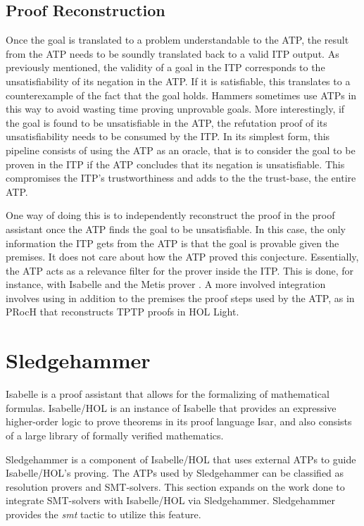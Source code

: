 \documentclass{article}
\begin{document}
		\subsection{Proof Reconstruction}
		Once the goal is translated to a problem understandable 
		to the ATP, the result from the ATP needs to be 
		soundly translated back to a valid ITP output.
		As previously mentioned, the validity of a goal in 
		the ITP corresponds to the unsatisfiability of its 
		negation in the ATP. If it is satisfiable, this 
		translates to a counterexample of the fact that 
		the goal holds. Hammers sometimes use ATPs 
		in this way to avoid wasting time proving 
		unprovable goals. More interestingly, if the 
		goal is found to be unsatisfiable in the ATP, 
		the refutation proof of its unsatisfiability
		needs to be consumed by the ITP. In its simplest form,
		this pipeline consists of using the ATP as an oracle, 
		that is to consider the goal to be proven in the 
		ITP if the ATP concludes that its negation is 
		unsatisfiable. This compromises the ITP's 
		trustworthiness and adds to the the trust-base, 
		the entire ATP.
		
		One way of doing this is to independently reconstruct 
		the proof in the proof assistant once the ATP finds 
		the goal to be unsatisfiable. In this case, the 
		only information the ITP gets from the ATP is that 
		the goal is provable given the premises. It does 
		not care about how the ATP proved this conjecture.
		Essentially, the ATP acts as a relevance filter for 
		the prover inside the ITP. This is done, for instance, 
		with Isabelle and the Metis prover 
		\cite{10.1007/978-3-540-74591-4_18}. A more involved
		integration involves using in addition to the premises
		the proof steps used by the ATP, as in PRocH
		\cite{10.1007/978-3-642-38574-2_18} that reconstructs 
		TPTP proofs in HOL Light.
		
\section{Sledgehammer}
\label{sec:hammer}
	Isabelle is a proof assistant that allows for the formalizing of mathematical 
	formulas. Isabelle/HOL is an instance of Isabelle that 
	provides an expressive higher-order logic to prove theorems 
	in its proof language Isar, and also consists of a large 
	library of formally verified mathematics. 
	
	Sledgehammer is a component of Isabelle/HOL that uses 
	external ATPs to guide Isabelle/HOL's proving. The ATPs 
	used by Sledgehammer can be classified as resolution 
	provers and SMT-solvers. This section expands on the work 
	done to integrate SMT-solvers with Isabelle/HOL via 
	Sledgehammer. Sledgehammer provides the \textit{smt}
	tactic to utilize this feature.
	
\end{document}
